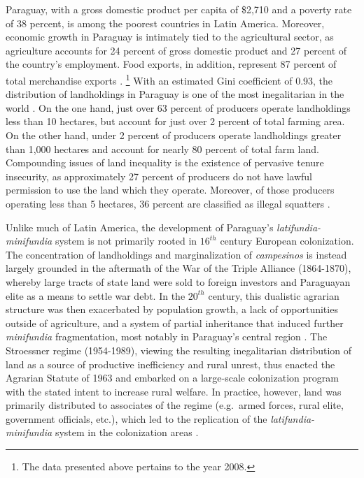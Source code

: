 \documentclass[english]{article}
\begin{document}
Paraguay, with a gross domestic product per capita of \$2,710 and a poverty 
rate of 38 percent, is among the poorest countries in Latin America. 
Moreover, economic growth in Paraguay is intimately tied to the agricultural 
sector, as agriculture accounts for 24 percent of gross domestic product and 
27 percent of the country's employment. 
Food exports, in addition, represent 87 percent of total merchandise exports 
\citep{wdi2012}.%
\footnote{The data presented above pertains to the year 2008.} 
With an estimated Gini coefficient of 0.93, the distribution of landholdings in 
Paraguay is one of the most inegalitarian in the world \citep{lipton2009}. 
On the one hand, just over 63 percent of producers operate landholdings less 
than 10 hectares, but account for just over 2 percent of total farming area.  
On the other hand, under 2 percent of producers operate landholdings 
greater than 1,000 hectares and account for nearly 80 percent of total farm 
land. 
Compounding issues of land inequality is the existence of pervasive tenure 
insecurity, as approximately 27 percent of producers do not have lawful 
permission to use the land which they operate. 
Moreover, of those producers operating less than 5 hectares, 36 percent are 
classified as illegal squatters \citep{mag2012}. 

Unlike much of Latin America, the development of Paraguay's 
\emph{latifundia-minifundia} system is not primarily rooted in $16^{th}$ 
century European colonization.
The concentration of landholdings and marginalization of 
\emph{campesinos} is instead largely grounded in the aftermath of the War 
of the Triple Alliance (1864-1870), whereby large tracts of state land were sold 
to foreign investors and Paraguayan elite as a means to settle war debt.
In the $20^{th}$ century, this dualistic agrarian structure was then exacerbated 
by population growth, a lack of opportunities outside of
agriculture, and a system of partial inheritance that induced further 
\emph{minifundia} fragmentation, most notably in Paraguay's central region
\citep{baer1984, danielsen2009}.
The Stroessner regime (1954-1989), viewing the resulting inegalitarian 
distribution of land as a source of productive inefficiency and rural unrest, 
thus enacted the Agrarian Statute of 1963 and embarked on a large-scale 
colonization program with the stated intent to increase rural welfare.
In practice, however, land was primarily distributed to associates of the 
regime (e.g.\ armed forces, rural elite, government officials, etc.), which led to 
the replication of the \emph{latifundia-minifundia} system in the 
colonization areas \citep{weisskoff1992, nagel1999}.
\end{document}
